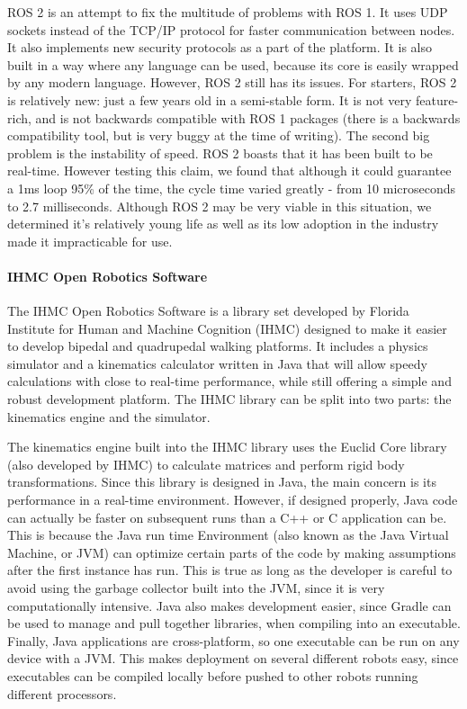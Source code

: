                 ROS 2 is an attempt to fix the multitude of problems with ROS 1. It uses UDP sockets instead of the TCP/IP protocol for faster communication between nodes. It also implements new security protocols as a part of the platform. It is also built in a way where any language can be used, because its core is easily wrapped by any modern language. 
                However, ROS 2 still has its issues. For starters, ROS 2 is relatively new: just a few years old in a semi-stable form. It is not very feature-rich, and is not backwards compatible with ROS 1 packages (there is a backwards compatibility tool, but is very buggy at the time of writing). The second big problem is the instability of speed. ROS 2 boasts that it has been built to be real-time. However testing this claim, we found that although it could guarantee a 1ms loop 95\% of the time, the cycle time varied greatly - from 10 microseconds to 2.7 milliseconds. Although ROS 2 may be very viable in this situation, we determined it's relatively young life as well as its low adoption in the industry made it impracticable for use.
        
            \paragraph*{IHMC Open Robotics Software}
                The IHMC Open Robotics Software is a library set developed by Florida Institute for Human and Machine Cognition (IHMC) designed to make it easier to develop bipedal and quadrupedal walking platforms. It includes a physics simulator and a kinematics calculator written in Java that will allow speedy calculations with close to real-time performance, while still offering a simple and robust development platform. The IHMC library can be split into two parts: the kinematics engine and the simulator.
        
                The kinematics engine built into the IHMC library uses the Euclid Core library (also developed by IHMC) to calculate matrices and perform rigid body transformations. Since this library is designed in Java, the main concern is its performance in a real-time environment. However, if designed properly, Java code can actually be faster on subsequent runs than a C++ or C application can be. This is because the Java run time Environment (also known as the Java Virtual Machine, or JVM) can optimize certain parts of the code by making assumptions after the first instance has run. This is true as long as the developer is careful to avoid using the garbage collector built into the JVM, since it is very computationally intensive. Java also makes development easier, since Gradle can be used to manage and pull together libraries, when compiling into an executable. Finally, Java applications are cross-platform, so one executable can be run on any device with a JVM. This makes deployment on several different robots easy, since executables can be compiled locally before pushed to other robots running different processors.
        
